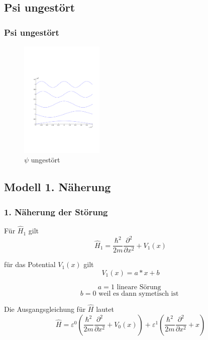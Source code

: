 \documentclass[aspectratio=169]{beamer}
\begin{document}
\subsection{ Psi ungest\"ort }
\begin{frame}
  \frametitle{ Psi ungest\"ort }
  \begin{figure}
    \centering
    \includegraphics[height=5.6cm,clip=true,trim=2cm 7cm 1cm 8cm]{../../skript/efeld/Psi_ungestoert.pdf}
    \caption{$\psi$ ungest\"ort}
    \label{abb:efeld_psi_ungestoert}
  \end{figure}

\end{frame}

\subsection{ Modell 1. N\"aherung }
\begin{frame} 
  \frametitle{ 1. N\"aherung der St\"orung }

  F\"ur $\hat H_1$ gilt
  \[
    \hat H_1 = \frac{\hbar^2}{2m} \frac{\partial^2}{\partial x^2} + V_1(x)
  \]

  f\"ur das Potential $V_1(x)$ gilt
  \[
    V_1(x) = a*x +b 
  \]
  
  \[
  a = 1 \text{ lineare S\"orung }
  \]
  \[
  b = 0 \text{ weil es dann symetisch ist }
  \]

  Die Ausgangsgleichung f\"ur $\hat{H}$ lautet
  \[
    \hat{H} = \varepsilon^0 ( \frac{\hbar^2}{2m} \frac{\partial^2}{\partial x^2} + V_0(x) )
               + \varepsilon^1 ( \frac{\hbar^2}{2m} \frac{\partial^2}{\partial x^2} + x )
  \]
\end{frame}
\end{document}
